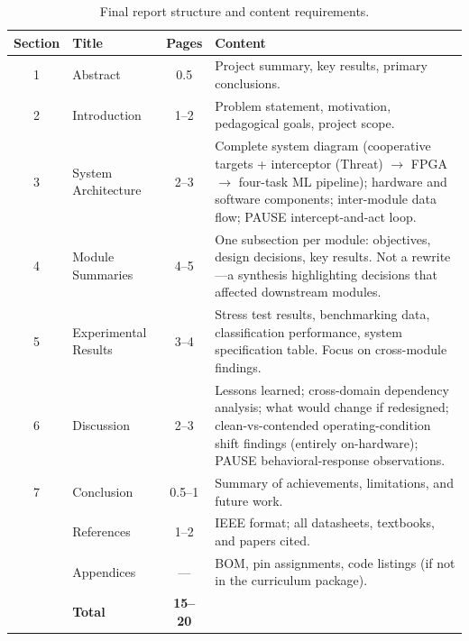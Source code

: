 \documentclass[11pt,letterpaper]{article}
\begin{document}
	\begin{table}[ht!]
		\centering
		\caption{Final report structure and content requirements.}
		\label{tab:report_structure}
		\renewcommand{\arraystretch}{1.3}
		\begin{tabularx}{\textwidth}{c l c X}
			\toprule
			\textbf{Section} & \textbf{Title} & \textbf{Pages} & \textbf{Content} \\
			\midrule
			1 & Abstract & 0.5 & Project summary, key results, primary conclusions. \\
			2 & Introduction & 1--2 & Problem statement, motivation, pedagogical goals, project scope. \\
			3 & System Architecture & 2--3 & Complete system diagram (cooperative targets + interceptor (Threat) $\to$ FPGA $\to$ four-task ML pipeline); hardware and software components; inter-module data flow; PAUSE intercept-and-act loop. \\
			4 & Module Summaries & 4--5 & One subsection per module: objectives, design decisions, key results. Not a rewrite---a synthesis highlighting decisions that affected downstream modules. \\
			5 & Experimental Results & 3--4 & Stress test results, benchmarking data, classification performance, system specification table. Focus on cross-module findings. \\
			6 & Discussion & 2--3 & Lessons learned; cross-domain dependency analysis; what would change if redesigned; clean-vs-contended operating-condition shift findings (entirely on-hardware); PAUSE behavioral-response observations. \\
			7 & Conclusion & 0.5--1 & Summary of achievements, limitations, and future work. \\
			& References & 1--2 & IEEE format; all datasheets, textbooks, and papers cited. \\
			& Appendices & --- & BOM, pin assignments, code listings (if not in the curriculum package). \\
			\midrule
			& \textbf{Total} & \textbf{15--20} & \\
			\bottomrule
		\end{tabularx}
	\end{table}
\end{document}
